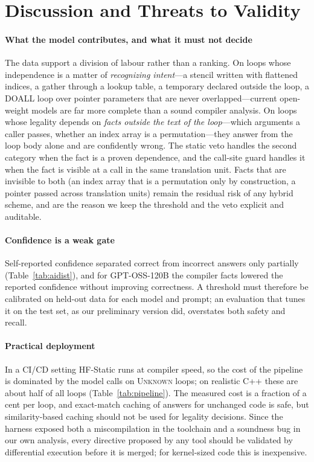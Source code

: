 \section{Discussion and Threats to Validity}
\label{sec:discussion}

\paragraph{What the model contributes, and what it must not decide} The data support a division of labour rather than a ranking. On loops whose independence is a matter of \emph{recognizing intent}---a stencil written with flattened indices, a gather through a lookup table, a temporary declared outside the loop, a DOALL loop over pointer parameters that are never overlapped---current open-weight models are far more complete than a sound compiler analysis. On loops whose legality depends on \emph{facts outside the text of the loop}---which arguments a caller passes, whether an index array is a permutation---they answer from the loop body alone and are confidently wrong. The static veto handles the second category when the fact is a proven dependence, and the call-site guard handles it when the fact is visible at a call in the same translation unit. Facts that are invisible to both (an index array that is a permutation only by construction, a pointer passed across translation units) remain the residual risk of any hybrid scheme, and are the reason we keep the threshold and the veto explicit and auditable.

\paragraph{Confidence is a weak gate} Self-reported confidence separated correct from incorrect answers only partially (Table~\ref{tab:aidist}), and for GPT-OSS-120B the compiler facts lowered the reported confidence without improving correctness. A threshold must therefore be calibrated on held-out data for each model and prompt; an evaluation that tunes it on the test set, as our preliminary version did, overstates both safety and recall.

\paragraph{Practical deployment} In a CI/CD setting HF-Static runs at compiler speed, so the cost of the pipeline is dominated by the model calls on \textsc{Unknown} loops; on realistic C++ these are about half of all loops (Table~\ref{tab:pipeline}). The measured cost is a fraction of a cent per loop, and exact-match caching of answers for unchanged code is safe, but similarity-based caching should not be used for legality decisions. Since the harness exposed both a miscompilation in the toolchain and a soundness bug in our own analysis, every directive proposed by any tool should be validated by differential execution before it is merged; for kernel-sized code this is inexpensive.

